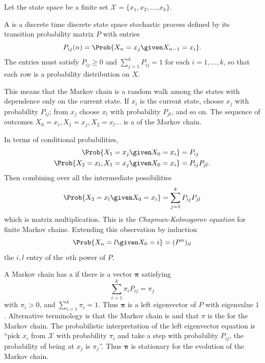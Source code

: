\documentclass[12pt]{article}
\begin{document}
Let the state space be a finite set \( \mathcal{X}=\{x_1,x_2,\ldots,x_k\}
\).
\begin{definition}
    A  is a discrete time discrete state space
    stochastic process%
    defined by its transition probability matrix \( P \) with entries
    \[
        P_{ij}(n)=\Prob{X_n=x_j \given X_{n-1}=x_i}.
    \] The entries must satisfy \( P_{ij} \ge 0 \) and \( \sum_{j=1}^k P_
    {ij} = 1 \) for each \( i=1, \dots, k \), so that each row is a
    probability distribution on \( X \).
\end{definition}

This means that the Markov chain is a random walk among the states with
dependence only on the current state.  If \( x_i \) is the current
state, choose \( x_j \) with probability \( P_{ij} \); from \( x_j \)
choose \( x_l \) with probability \( P_{jl} \), and so on.  The sequence
of outcomes \( X_0 = x_i, X_1 = x_j, X_2 = x_l \dots \) is a  of the Markov chain.%

In terms of conditional probabilities,
\begin{align*}
    \Prob{X_1 = x_j \given X_0 = x_{i}} &= P_{ij} \\
    \Prob{X_2 = x_l, X_1 = x_j \given X_0 = x_i} &= P_{ij}P_{jl}.  \\
\end{align*}
Then combining over all the intermediate possibilities
\[
    \Prob{X_2 = x_l \given X_0 = x_i} = \sum\limits_{j =1}^k P_{ij}P_{jl}
\] which is matrix multiplication.  This is the \textit{Chapman-Kolmogorov
equation} for finite Markov chains.%
Extending this observation by induction
\[
    \Prob{X_n = l \given X_0 = i} = (P^n)_{il}
\] the \( i,l \) entry of the \( n \)th power of \( P \).

A Markov chain has a  if there is a vector
\( \mathbf{\pi} \) satisfying
\[
    \sum\limits_{i=1}^k \pi_i P_{ij} = \pi_{j}
\] with \( \pi_i > 0 \), and \( \sum_{i=1}^k \pi_i = 1 \).  Thus \(
\mathbf{\pi} \) is a left eigenvector of \( P \) with eigenvalue \( 1 \).
Alternative terminology is that the Markov chain is  and that \( \pi \) is the %
for the Markov chain.  The probabilistic interpretation of the left
eigenvector equation is ``pick \( x_i \) from \( \mathcal{X} \) with
probability \( \pi_i \) and take a step with probability \( P_{ij} \),
the probability of being at \( x_j \) is \( \pi_{j} \)''.  Thus \(
\mathbf{\pi} \) is stationary for the evolution of the Markov chain.
\end{document}
